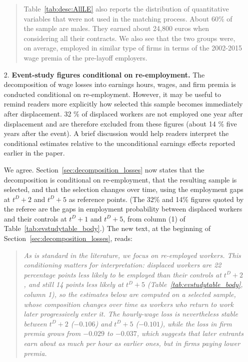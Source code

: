 \documentclass[11pt]{article}
\newcommand{\comment}[1]{\begingroup #1\endgroup}
\newcommand{\answer}[1]{\begingroup\color{navy}#1\endgroup}
\begin{document}
\begin{enumerate}[leftmargin=*]
{\begin{quote}
Table~\ref{tab:desc:AllLE} also reports the distribution of quantitative variables that were not used in the matching process. About 60\% of the sample are males. They earned about 24,800 euros when considering all their contracts. We also see that the two groups were, on average, employed in similar type of firms in terms of the 2002-2015 wage premia of the pre-layoff employers.
\end{quote}
}\par




\item[2.] 
\comment{\textbf{Event-study figures conditional on re-employment.} The decomposition of wage losses into earnings hours, wages, and firm premia is conducted conditional on re-employment. However, it may be useful to remind readers more explicitly how selected this sample becomes immediately after displacement. 32 \% of displaced workers are not employed one year after displacement and are therefore excluded from these figures (about 14 \% five years after the event). A brief discussion would help readers interpret the conditional estimates relative to the unconditional earnings effects reported earlier in the paper.
}\par

\answer{We agree. Section~\ref{sec:decomposition_losses} now states that the decomposition is conditional on re-employment, that the resulting sample is selected, and that the selection changes over time, using the employment gaps at $t^D+2$ and $t^D+5$ as reference points. (The 32\% and 14\% figures quoted by the referee are the gaps in employment probability between displaced workers and their controls at $t^D+1$ and $t^D+5$, from column (1) of Table~\ref{tab:evstudytable_body}.) The new text, at the beginning of Section~\ref{sec:decomposition_losses}, reads:
\begin{quote}\itshape
As is standard in the literature, we focus on re-employed workers. This conditioning matters for interpretation: displaced workers are 22 percentage points less likely to be employed than their controls at $t^D+2$, and still 14 points less likely at $t^D+5$ (Table~\ref{tab:evstudytable_body}, column 1), so the estimates below are computed on a selected sample, whose composition changes over time as workers who return to work later progressively enter it. The hourly-wage loss is nevertheless stable between $t^D+2$ ($-0.106$) and $t^D+5$ ($-0.101$), while the loss in firm premia grows from $-0.029$ to $-0.037$, which suggests that later entrants earn about as much per hour as earlier ones, but in firms paying lower premia.
\end{quote}
}\par



\end{enumerate}
\end{document}

